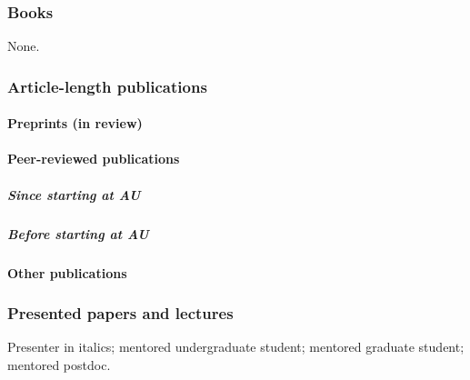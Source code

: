 \subsubsection{Books}
None.

\subsubsection{Article-length publications}



\paragraph{Preprints (in review)}
\nocite{*}
\printbibliography[filter=cvpreprints, heading=none]

\paragraph{Peer-reviewed publications}

\subparagraph{Since starting at AU}
\nocite{*}
\printbibliography[filter=cvpapersnopreprints, check=afteraustart, heading=none]

\subparagraph{Before starting at AU}
\nocite{*}
\printbibliography[filter=cvpapersnopreprints, check=beforeaustart, heading=none]

\paragraph{Other publications}


\subsubsection{Presented papers and lectures}
Presenter in italics;
\ugsymbol{}mentored undergraduate student;
\phdsymbol{}mentored graduate student;
\postdocsymbol{}mentored postdoc.

